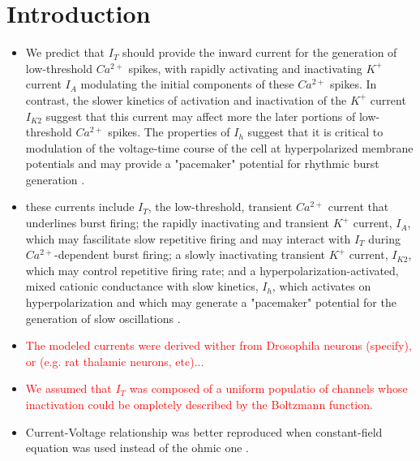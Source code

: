 \documentclass[./workflow.tex]{subfiles}
\begin{document}
    \section{Introduction}

    \begin{itemize}
        \item We predict that $I_T$ should provide the inward current for the generation of low-threshold
        $Ca^{2+}$ spikes, with rapidly activating and inactivating $K^+$ current $I_A$ modulating the
        initial components of these $Ca^{2+}$ spikes. In contrast, the slower kinetics of activation
        and inactivation of the $K^+$ current $I_{K2}$ suggest that this current may affect more the
        later portions of low-threshold $Ca^{2+}$ spikes. The properties of $I_h$ suggest that it is 
        critical to modulation of the voltage-time course of the cell at hyperpolarized membrane potentials and
        may provide a "pacemaker" potential for rhythmic burst generation
        \parencite{huguenardSimulationCurrentsInvolved1992}.

        \item these currents include $I_T$, the low-threshold, transient $Ca^{2+}$ current that underlines
        burst firing; the rapidly inactivating and transient $K^{+}$ current, $I_A$, which may fascilitate
        slow repetitive firing and may interact with $I_T$ during $Ca^{2+}$-dependent burst firing;
        a slowly inactivating transient $K^+$ current, $I_{K2}$, which may control repetitive firing rate;
        and a hyperpolarization-activated, mixed cationic conductance with slow kinetics, $I_h$, which activates
        on hyperpolarization and which may generate a "pacemaker" potential for the generation of slow
        oscillations \parencite{huguenardSimulationCurrentsInvolved1992}.

        \item \textcolor{red}{The modeled currents were derived wither from Drosophila neurons (specify),
        or (e.g. rat thalamic neurons, etc)...}

        \item \textcolor{red}{We assumed that $I_T$ was composed of a uniform populatio of channels
        whose inactivation could be ompletely described by the Boltzmann function.}

        \item Current-Voltage relationship was better reproduced when constant-field equation was
        used instead of the ohmic one \parencite{huguenardSimulationCurrentsInvolved1992}.


\end{itemize}
\end{document}
